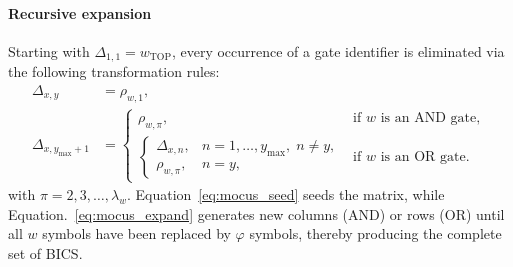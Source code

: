 \paragraph{Recursive expansion}
Starting with $\Delta_{1,1}=w_{\text{TOP}}$, every occurrence of a gate identifier is eliminated via the following transformation rules:
\begin{align}
  \Delta_{x,y}     &= \rho_{w,1}, \label{eq:mocus_seed} \\
  \Delta_{x,y_{\max}+1} &=
    \begin{cases}
      \rho_{w,\pi}, & \text{if } w \text{ is an AND gate},\\[4pt]
      \begin{cases}
        \Delta_{x,n}, & n=1,\dots,y_{\max},\; n\neq y,\\
        \rho_{w,\pi}, & n = y,
      \end{cases} & \text{if } w \text{ is an OR gate}.
    \end{cases}\label{eq:mocus_expand}
\end{align}
with $\pi=2,3,\dots,\lambda_w$.  
Equation~\eqref{eq:mocus_seed} seeds the matrix, while Equation.~\eqref{eq:mocus_expand} generates new columns (AND) or rows (OR) until all $w$ symbols have been replaced by $\varphi$ symbols, thereby producing the complete set of BICS.